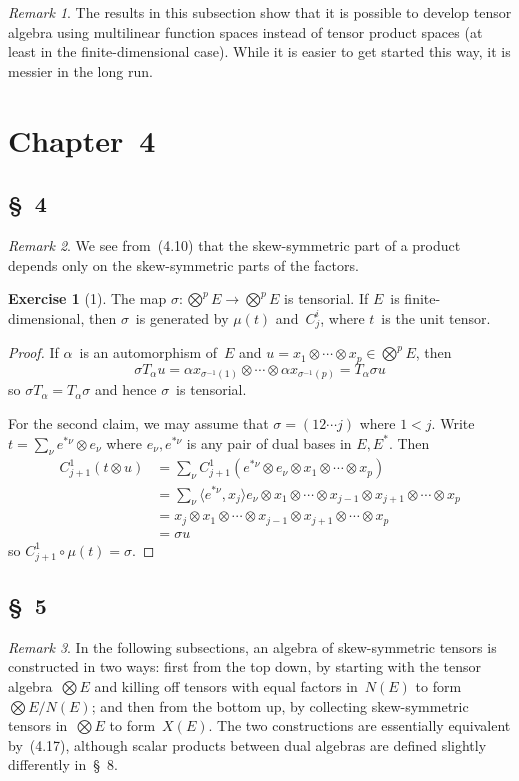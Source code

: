 \documentclass[letterpaper,12pt]{article}
\newcommand{\after}{\circ}
\newcommand{\tprod}{\otimes}
\newcommand{\bigtprod}{\bigotimes}
\newcommand{\medtprod}{{\textstyle\bigtprod}}
\newcommand{\sprod}[2]{\langle#1,#2\rangle}
\newcommand{\multi}[4]{#2_{#3}#1\cdots#1#2_{#4}}
\newcommand{\tprods}[3]{\multi{\tprod}{#1}{#2}{#3}}
\theoremstyle{definition}
\newtheorem*{exer}{Exercise}
\theoremstyle{remark}
\newtheorem*{rmk}{Remark}
\begin{document}
\begin{rmk}
The results in this subsection show that it is possible to develop tensor algebra using multilinear function spaces instead of tensor product spaces (at least in the finite-dimensional case). While it is easier to get started this way, it is messier in the long run.
\end{rmk}

\section*{Chapter~4}
\subsection*{\S~4}
\begin{rmk}
We see from~(4.10) that the skew-symmetric part of a product depends only on the skew-symmetric parts of the factors.
\end{rmk}

\begin{exer}[1]
The map \(\sigma:\medtprod^p E\to\medtprod^p E\) is tensorial. If \(E\)~is finite-dimensional, then \(\sigma\)~is generated by \(\mu(t)\) and~\(C^i_j\), where \(t\)~is the unit tensor.
\end{exer}
\begin{proof}
If \(\alpha\)~is an automorphism of~\(E\) and \(u=\tprods{x}{1}{p}\in\medtprod^p E\), then
\[\sigma T_{\alpha}u=\tprods{\alpha x}{\sigma^{-1}(1)}{\sigma^{-1}(p)}=T_{\alpha}\sigma u\]
so \(\sigma T_{\alpha}=T_{\alpha}\sigma\) and hence \(\sigma\)~is tensorial.

For the second claim, we may assume that \(\sigma=(12\cdots j)\) where \(1<j\). Write \(t=\sum_{\nu}e^{*\nu}\tprod e_{\nu}\) where \(e_{\nu},e^{*\nu}\) is any pair of dual bases in \(E,E^*\). Then
\begin{align*}
C^1_{j+1}(t\tprod u)&=\sum_{\nu}C^1_{j+1}(e^{*\nu}\tprod e_{\nu}\tprod\tprods{x}{1}{p})\\
	&=\sum_{\nu}\sprod{e^{*\nu}}{x_j}e_{\nu}\tprod\tprods{x}{1}{j-1}\tprod\tprods{x}{j+1}{p}\\
	&=x_j\tprod\tprods{x}{1}{j-1}\tprod\tprods{x}{j+1}{p}\\
	&=\sigma u
\end{align*}
so \(C^1_{j+1}\after\mu(t)=\sigma\).
\end{proof}

\subsection*{\S~5}
\begin{rmk}
In the following subsections, an algebra of skew-symmetric tensors is constructed in two ways: first from the top down, by starting with the tensor algebra~\(\medtprod E\) and killing off tensors with equal factors in~\(N(E)\) to form \(\medtprod E/N(E)\); and then from the bottom up, by collecting skew-symmetric tensors in~\(\medtprod E\) to form~\(X(E)\). The two constructions are essentially equivalent by~(4.17), although scalar products between dual algebras are defined slightly differently in~\S~8.
\end{rmk}
\end{document}
